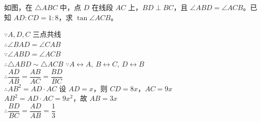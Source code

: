\documentclass{exam-zh}
\begin{document}

\begin{eduProblemBlock}[例题]
\noindent
\begin{minipage}[t]{\dimexpr\linewidth-70mm-6mm\relax}
\vspace{0pt}
如图，在 $\triangle ABC$ 中，点 $D$ 在线段 $AC$ 上，$BD\perp BC$，且
$\angle ABD=\angle ACB$。已知 $AD:CD=1:8$，求 $\tan\angle ACB$。

\end{minipage}\hfill
\begin{diagramcoltikz}{70mm}{先在图中圈出子三角形 $ABD$ 和母三角形 $ACB$。}
}
\end{diagramcoltikz}
\end{eduProblemBlock}










\begin{eduDualExplain}
  \begin{eduExplainLeft}
  \end{eduExplainLeft}

  \begin{eduExplainRight}
$\because A,D,C$ 三点共线\\
$\therefore \angle BAD=\angle CAB$\\
$\because \angle ABD=\angle ACB$\\
$\therefore \triangle ABD\sim\triangle ACB$
$\because A\leftrightarrow A,\ B\leftrightarrow C,\ D\leftrightarrow B$\\
$\therefore \dfrac{AD}{AB}=\dfrac{AB}{AC}=\dfrac{BD}{BC}$\\
$\therefore AB^2=AD\cdot AC$
设 $AD=x$，则 $CD=8x$，$AC=9x$\\
$AB^2=AD\cdot AC=9x^2$，故 $AB=3x$\\
$\therefore \dfrac{BD}{BC}=\dfrac{AD}{AB}=\dfrac13$
  \end{eduExplainRight}
\end{eduDualExplain}
\end{document}
